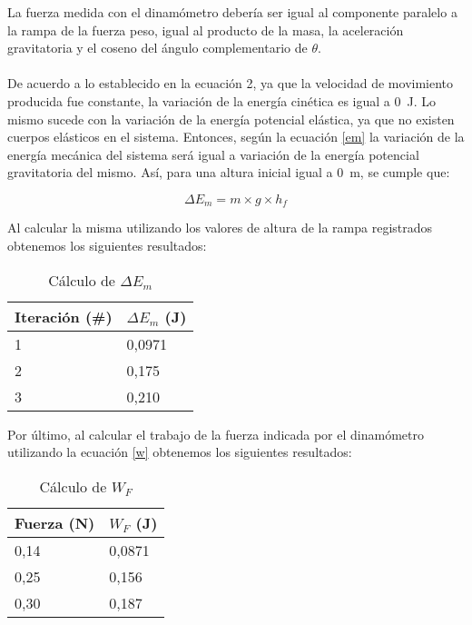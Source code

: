 \documentclass{article}
\begin{document}
La fuerza medida con el dinamómetro debería ser igual al componente paralelo a la rampa de la fuerza peso, igual al producto de la masa, la aceleración gravitatoria y el coseno del ángulo complementario de $\theta$.
\\
\\
De acuerdo a lo establecido en la ecuación 2, ya que la velocidad de movimiento producida fue constante, la variación de la energía cinética es igual a \qty{0}{J}. Lo mismo sucede con la variación de la energía potencial elástica, ya que no existen cuerpos elásticos en el sistema.  Entonces, según la ecuación \ref{em} la variación de la energía mecánica del sistema será igual a variación de la energía potencial gravitatoria del mismo. Así, para una altura inicial igual a \qty{0}{m}, se cumple que:

\begin{equation}
\Delta E_m = m \times g \times h_f
\end{equation}

Al calcular la misma utilizando los valores de altura de la rampa registrados obtenemos los siguientes resultados:

\begin{table}[H]
\centering
\begin{tabular}{|l|l|}
\hline
\rowcolor[HTML]{C0C0C0} 
Iteración (\#) & $\Delta E_m$ (J) \\ \hline
1 & 0,0971 \\ \hline
2 & 0,175 \\ \hline
3 & 0,210 \\ \hline
\end{tabular}
\caption{Cálculo de $\Delta E_m$}
\label{table:calculoem}
\end{table}

Por último, al calcular el trabajo de la fuerza indicada por el dinamómetro utilizando la ecuación \ref{w} obtenemos los siguientes resultados:

\begin{table}[H]
\centering
\begin{tabular}{|l|l|}
\hline
\rowcolor[HTML]{C0C0C0} 
Fuerza (N) & $W_F$ (J) \\ \hline
0,14 & 0,0871 \\ \hline
0,25 & 0,156 \\ \hline
0,30 & 0,187 \\ \hline
\end{tabular}
\caption{Cálculo de $W_F$}
\label{table:calculowf}
\end{table}
\end{document}
